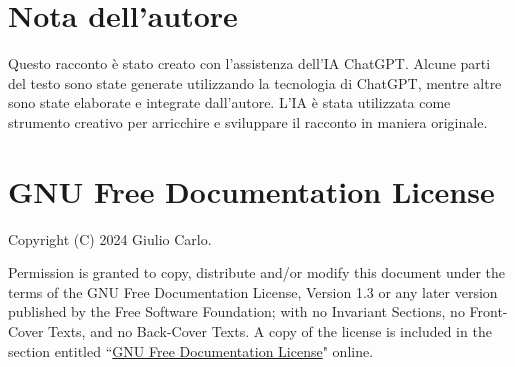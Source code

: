 \documentclass[12pt,b5paper]{article}
\begin{document}
\section*{Nota dell'autore}
Questo racconto è stato creato con l'assistenza dell'IA ChatGPT. Alcune parti
del testo sono state generate utilizzando la tecnologia di ChatGPT, mentre altre
sono state elaborate e integrate dall'autore. L'IA è stata utilizzata come
strumento creativo per arricchire e sviluppare il racconto in maniera originale.
\section*{GNU Free Documentation License}
    Copyright (C)  2024 Giulio Carlo.
   
    Permission is granted to copy, distribute and/or modify this document
    under the terms of the GNU Free Documentation License, Version 1.3
    or any later version published by the Free Software Foundation;
    with no Invariant Sections, no Front-Cover Texts, and no Back-Cover Texts.
    A copy of the license is included in the section entitled ``\href{https://www.gnu.org/licenses/fdl-1.3.en.html}{GNU Free Documentation License}"
    online.
\end{document}
